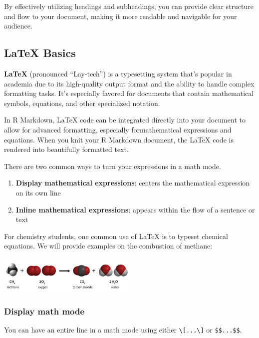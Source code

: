 \documentclass[
]{book}
\providecommand{\tightlist}{%
  \setlength{\itemsep}{0pt}\setlength{\parskip}{0pt}}
\begin{document}
By effectively utilizing headings and subheadings, you can provide clear structure and flow to your document, making it more readable and navigable for your audience.

\hypertarget{latex-basics}{%
\subsection{LaTeX Basics}\label{latex-basics}}

\textbf{LaTeX} (pronounced ``Lay-tech'') is a typesetting system that's popular in academia due to its high-quality output format and the ability to handle complex formatting tasks. It's especially favored for documents that contain mathematical symbols, equations, and other specialized notation.

In R Markdown, LaTeX code can be integrated directly into your document to allow for advanced formatting, especially formathematical expressions and equations. When you knit your R Markdown document, the LaTeX code is rendered into beautifully formatted text.

There are two common ways to turn your expressions in a math mode.

\begin{enumerate}
\def\labelenumi{\arabic{enumi}.}
\tightlist
\item
  \textbf{Display mathematical expressions}: centers the mathematical expression on its own line\\
\item
  \textbf{Inline mathematical expressions}: appears within the flow of a sentence or text
\end{enumerate}

For chemistry students, one common use of LaTeX is to typeset chemical equations. We will provide examples on the combustion of methane:

\includegraphics[width=0.5\textwidth,height=\textheight]{images/methane_example.jpeg}

\hypertarget{display-math-mode}{%
\subsubsection{Display math mode}\label{display-math-mode}}

You can have an entire line in a math mode using either \texttt{\textbackslash{}{[}...\textbackslash{}{]}} or \texttt{\$\$...\$\$}.
\end{document}
